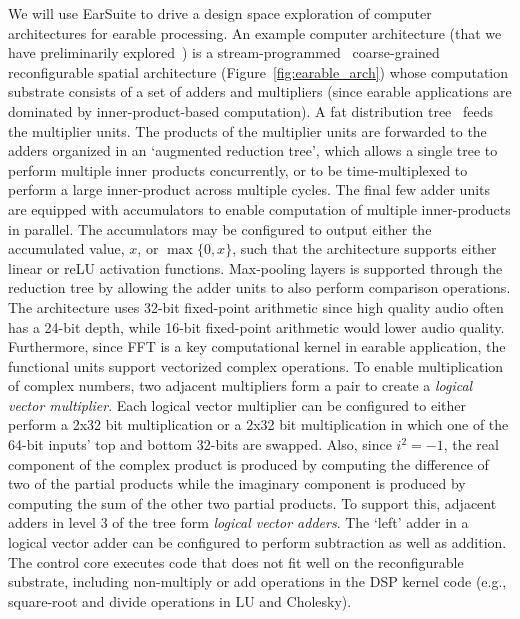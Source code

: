 We will use EarSuite to drive a design space exploration of computer
architectures for earable processing. An example computer architecture (that we
have preliminarily explored~\cite{bleier2022rethinking}) is  a
stream-programmed~\cite{nowatzki2017stream} coarse-grained reconfigurable
spatial architecture (Figure~\ref{fig:earable_arch}) whose computation
substrate consists of a set of  adders and multipliers (since earable
applications are dominated by inner-product-based computation).
A fat distribution
tree~\cite{leiserson1985fat}  feeds the multiplier units.  The products
of the multiplier units are forwarded to the adders organized in an `augmented
reduction tree', which allows a single tree to perform multiple inner
products concurrently, or to be time-multiplexed to perform a large inner-product across multiple cycles.
The final few adder units are equipped
with accumulators to enable computation of multiple inner-products in parallel. The accumulators may be configured to output either
the accumulated value, $x$, or $\max{\{0, x\}}$, such that the architecture supports
either linear or reLU activation functions.  Max-pooling
layers is supported through the reduction tree by allowing the adder units to also perform
comparison operations.
 The architecture  uses  32-bit fixed-point arithmetic since high quality audio
often has a 24-bit depth, while 16-bit fixed-point arithmetic would %
lower audio quality. 
Furthermore, since FFT is a key computational kernel in earable application, the
functional units support vectorized complex operations. To enable 
multiplication of complex numbers, two adjacent multipliers form a pair to create a  {\em
logical vector multiplier}.
Each logical vector multiplier can be configured to either perform a 2x32 bit
multiplication or a 2x32 bit multiplication in which one of the 64-bit inputs'
top and bottom 32-bits are swapped. Also, since $i^2 = -1$, the real component
of the complex product is produced by computing the difference of two of the
partial products while the imaginary component is produced by computing the sum
of the other two partial products. To support this,  adjacent adders in level 3
of the tree form  \textit{logical vector adders}. The `left' adder in a logical
vector adder can be configured to perform subtraction as well as addition. The
control core executes code that does not fit well on the reconfigurable
substrate, including non-multiply or add operations in the DSP kernel code
(e.g., square-root and divide operations in LU and Cholesky).


